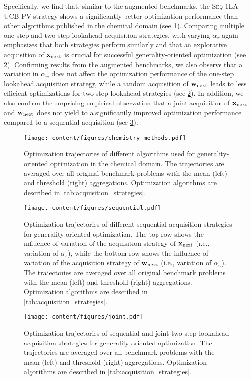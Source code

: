 Specifically, we find that, similar to the augmented benchmarks, the \textsc{Seq 1LA-UCB-PV} strategy shows a significantly better optimization performance than other algorithms published in the chemical domain (see \cref{fig:results_average_runs_orig}).
Comparing multiple one-step and two-step lookahead acquisition strategies, with varying $\alpha_x$ again emphasizes that both strategies perform similarly and that an explorative acquisition of ${\mathbf{x}}_{\text{next}}$ is crucial for successful generality-oriented optimization (see \cref{fig:results_sequential_orig}).
Confirming results from the augmented benchmarks, we also observe that a variation in $\alpha_w$ does not affect the optimization performance of the one-step lookahead acquisition strategy, while a random acquisition of ${\mathbf{w}}_{\text{next}}$ leads to less efficient optimizations for two-step lookahead strategies (see \cref{fig:results_sequential_orig}).
In addition, we also confirm the surprising empirical observation that a joint acquisition of ${\mathbf{x}}_{\text{next}}$ and ${\mathbf{w}}_{\text{next}}$ does not yield to a significantly improved optimization performance compared to a sequential acquisition (see \cref{fig:results_joint_orig}).
\begin{figure}[t]
    \centering
    \texttt{[image: content/figures/chemistry\_methods.pdf]}
    \caption{Optimization trajectories of different algorithms used for generality-oriented optimization in the chemical domain. The trajectories are averaged over all original benchmark problems with the mean (left) and threshold (right) aggregations. Optimization algorithms are described in \cref{tab:acquisition_strategies}.
    }
    \label{fig:results_average_runs_orig}
\end{figure}
\begin{figure}[t]
    \centering
    \texttt{[image: content/figures/sequential.pdf]}
    \caption{Optimization trajectories of different sequential acquisition strategies for generality-oriented optimization. The top row shows the influence of variation of the acquisition strategy of ${\mathbf{x}}_{\text{next}}$ (i.e., variation of $\alpha_x$), while the bottom row shows the influence of variation of the acquisition strategy of ${\mathbf{w}}_{\text{next}}$ (i.e., variation of $\alpha_w$). The trajectories are averaged over all original benchmark problems with the mean (left) and threshold (right) aggregations. Optimization algorithms are described in \cref{tab:acquisition_strategies}.
    }
    \label{fig:results_sequential_orig}
\end{figure}
\begin{figure}[t]
    \centering
    \texttt{[image: content/figures/joint.pdf]}
    \caption{Optimization trajectories of sequential and joint two-step lookahead acquisition strategies for generality-oriented optimization. The trajectories are averaged over all benchmark problems with the mean (left) and threshold (right) aggregations. Optimization algorithms are described in \cref{tab:acquisition_strategies}.
    }
    \label{fig:results_joint_orig}
\end{figure}

